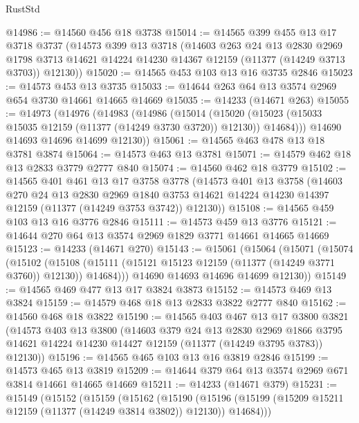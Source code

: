 \begin{lexlean}{RustStd}
\begin{coremodule}
{\begin{coremodule}
{{{{{{{{{{{{{{{{{{{{{{{{{{{{{{{{{@14986 := @14560 @456 @18 @3738
@15014 := @14565
    @399
    @455
    @13
    @17
    @3718
    @3737
    (@14573
      @399
      @13
      @3718
      (@14603
        @263
        @24
        @13
        @2830
        @2969
        @1798
        @3713
        @14621
        @14224
        @14230
        @14367
        @12159
        (@11377 (@14249 @3713 @3703))
        @12130))
@15020 := @14565 @453 @103 @13 @16 @3735 @2846
@15023 := @14573 @453 @13 @3735
@15033 := @14644 @263 @64 @13 @3574 @2969 @654 @3730 @14661 @14665 @14669
@15035 := @14233 (@14671 @263)
@15055 := @14973
    (@14976
      (@14983
        (@14986
          (@15014
            (@15020 (@15023 (@15033 @15035 @12159 (@11377 (@14249 @3730 @3720)) @12130)) @14684)))
        @14690
        @14693
        @14696
        @14699
        @12130))
@15061 := @14565 @463 @478 @13 @18 @3781 @3874
@15064 := @14573 @463 @13 @3781
@15071 := @14579 @462 @18 @13 @2833 @3779 @2777 @840
@15074 := @14560 @462 @18 @3779
@15102 := @14565
    @401
    @461
    @13
    @17
    @3758
    @3778
    (@14573
      @401
      @13
      @3758
      (@14603
        @270
        @24
        @13
        @2830
        @2969
        @1840
        @3753
        @14621
        @14224
        @14230
        @14397
        @12159
        (@11377 (@14249 @3753 @3742))
        @12130))
@15108 := @14565 @459 @103 @13 @16 @3776 @2846
@15111 := @14573 @459 @13 @3776
@15121 := @14644 @270 @64 @13 @3574 @2969 @1829 @3771 @14661 @14665 @14669
@15123 := @14233 (@14671 @270)
@15143 := @15061
    (@15064
      (@15071
        (@15074
          (@15102
            (@15108 (@15111 (@15121 @15123 @12159 (@11377 (@14249 @3771 @3760)) @12130)) @14684)))
        @14690
        @14693
        @14696
        @14699
        @12130))
@15149 := @14565 @469 @477 @13 @17 @3824 @3873
@15152 := @14573 @469 @13 @3824
@15159 := @14579 @468 @18 @13 @2833 @3822 @2777 @840
@15162 := @14560 @468 @18 @3822
@15190 := @14565
    @403
    @467
    @13
    @17
    @3800
    @3821
    (@14573
      @403
      @13
      @3800
      (@14603
        @379
        @24
        @13
        @2830
        @2969
        @1866
        @3795
        @14621
        @14224
        @14230
        @14427
        @12159
        (@11377 (@14249 @3795 @3783))
        @12130))
@15196 := @14565 @465 @103 @13 @16 @3819 @2846
@15199 := @14573 @465 @13 @3819
@15209 := @14644 @379 @64 @13 @3574 @2969 @671 @3814 @14661 @14665 @14669
@15211 := @14233 (@14671 @379)
@15231 := @15149
    (@15152
      (@15159
        (@15162
          (@15190
            (@15196 (@15199 (@15209 @15211 @12159 (@11377 (@14249 @3814 @3802)) @12130)) @14684)))
}}}}}}}}}}}}}}}}}}}}}}}}}}}}}}}}}
\end{coremodule}}
\end{coremodule}
\end{lexlean}
